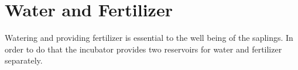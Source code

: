 \documentclass[../main]{subfiles}
\begin{document}
\chapter{Water and Fertilizer} \label{chp:}

Watering and providing fertilizer is essential to the well being of
the saplings. In order to do that the incubator provides two reservoirs
for water and fertilizer separately.







% 
%
% 
\end{document}
